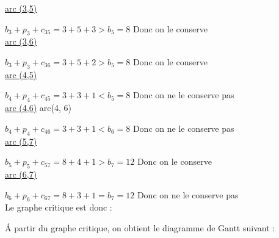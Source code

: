 \documentclass[12pt]{article}
\begin{document}
\underline{arc (3,5)}

$b_3 + p_3 + c_{35} = 3 + 5 + 3 > b_5 = 8$ Donc on le conserve\\

\underline{arc (3,6)}

$b_3 + p_3 + c_{36} = 3 + 5 + 2 > b_5 = 8$ Donc on le conserve\\

\underline{arc (4,5)}

$b_4 + p_4 + c_{45} = 3 + 3 + 1 < b_5 = 8$ Donc on ne le conserve pas\\

\underline{arc (4,6)}
arc(4, 6)

$b_4 + p_4 + c_{46} = 3 + 3 + 1 < b_6 = 8$ Donc on ne le conserve pas\\

\underline{arc (5,7)}

$b_5 + p_5 + c_{57} = 8 + 4 + 1 > b_7 = 12$ Donc on le conserve\\

\underline{arc (6,7)}

$b_6 + p_6 + c_{67} = 8 + 3 + 1 = b_7 = 12$ Donc on ne le conserve pas\\

Le graphe critique est donc :

\begin{figure}[H]

  \centering


\end{figure}

\'A partir du graphe critique, on obtient le diagramme de Gantt
suivant :

\end{document}
